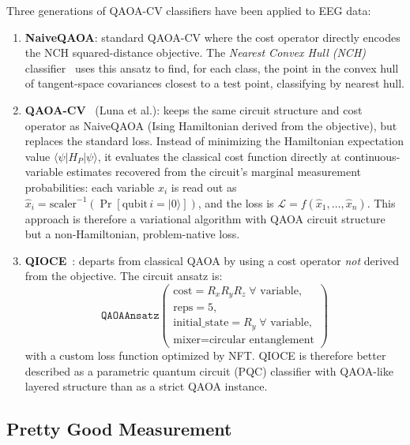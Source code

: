 \documentclass{article}
\begin{document}
Three generations of QAOA-CV classifiers have been applied to EEG data:
\begin{enumerate}
  \item \textbf{NaiveQAOA}: standard QAOA-CV where the cost operator directly
    encodes the NCH squared-distance objective.  The \emph{Nearest Convex
    Hull (NCH)} classifier~\cite{quanticNCH2023} uses this ansatz to find,
    for each class, the point in the convex hull of tangent-space covariances
    closest to a test point, classifying by nearest hull.
  \item \textbf{QAOA-CV}~\cite{luna2025qaoacv} (Luna et al.): keeps the
    same circuit structure and cost operator as NaiveQAOA (Ising
    Hamiltonian derived from the objective), but replaces the standard
    loss.  Instead of minimizing the Hamiltonian expectation value
    $\langle\psi|H_P|\psi\rangle$, it evaluates the classical cost function
    directly at continuous-variable estimates recovered from the circuit's
    marginal measurement probabilities: each variable $x_i$ is read out as
    $\hat{x}_i = \mathrm{scaler}^{-1}(\Pr[\text{qubit}\,i = |0\rangle])$,
    and the loss is $\mathcal{L} = f(\hat{x}_1, \ldots, \hat{x}_n)$.
    This approach is therefore a variational algorithm with QAOA
    circuit structure but a non-Hamiltonian, problem-native loss.
  \item \textbf{QIOCE}~\cite{qioce2023}: departs from classical QAOA by
    using a cost operator \emph{not} derived from the objective.  The
    circuit ansatz is:
    \begin{equation*}
      \texttt{QAOAAnsatz}\!\left(\!\begin{array}{l}
        \text{cost} = R_xR_yR_z\;\forall\text{ variable},\\
        \text{reps} = 5,\\
        \text{initial\_state} = R_y\;\forall\text{ variable},\\
        \text{mixer} = \text{circular entanglement}
      \end{array}\!\right)
    \end{equation*}
    with a custom loss function optimized by NFT\@.  QIOCE is therefore
    better described as a parametric quantum circuit (PQC) classifier
    with QAOA-like layered structure than as a strict QAOA instance.
\end{enumerate}

\subsection{Pretty Good Measurement}
\end{document}

